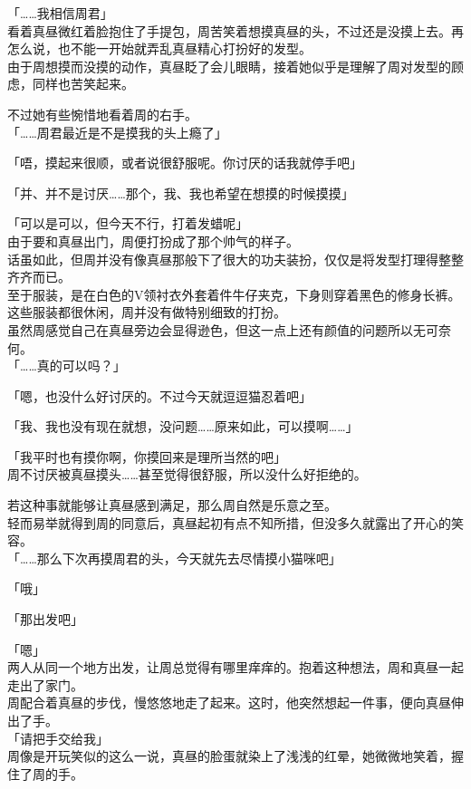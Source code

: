 「……我相信周君」\\

看着真昼微红着脸抱住了手提包，周苦笑着想摸真昼的头，不过还是没摸上去。再怎么说，也不能一开始就弄乱真昼精心打扮好的发型。\\

由于周想摸而没摸的动作，真昼眨了会儿眼睛，接着她似乎是理解了周对发型的顾虑，同样也苦笑起来。

不过她有些惋惜地看着周的右手。\\

「……周君最近是不是摸我的头上瘾了」

「唔，摸起来很顺，或者说很舒服呢。你讨厌的话我就停手吧」

「并、并不是讨厌……那个，我、我也希望在想摸的时候摸摸」

「可以是可以，但今天不行，打着发蜡呢」\\

由于要和真昼出门，周便打扮成了那个帅气的样子。\\

话虽如此，但周并没有像真昼那般下了很大的功夫装扮，仅仅是将发型打理得整整齐齐而已。\\

至于服装，是在白色的V领衬衣外套着件牛仔夹克，下身则穿着黑色的修身长裤。这些服装都很休闲，周并没有做特别细致的打扮。\\

虽然周感觉自己在真昼旁边会显得逊色，但这一点上还有颜值的问题所以无可奈何。\\

「……真的可以吗？」

「嗯，也没什么好讨厌的。不过今天就逗逗猫忍着吧」

「我、我也没有现在就想，没问题……原来如此，可以摸啊……」

「我平时也有摸你啊，你摸回来是理所当然的吧」\\

周不讨厌被真昼摸头……甚至觉得很舒服，所以没什么好拒绝的。

若这种事就能够让真昼感到满足，那么周自然是乐意之至。\\

轻而易举就得到周的同意后，真昼起初有点不知所措，但没多久就露出了开心的笑容。\\

「……那么下次再摸周君的头，今天就先去尽情摸小猫咪吧」

「哦」

「那出发吧」

「嗯」\\

两人从同一个地方出发，让周总觉得有哪里痒痒的。抱着这种想法，周和真昼一起走出了家门。\\

周配合着真昼的步伐，慢悠悠地走了起来。这时，他突然想起一件事，便向真昼伸出了手。\\

「请把手交给我」\\

周像是开玩笑似的这么一说，真昼的脸蛋就染上了浅浅的红晕，她微微地笑着，握住了周的手。
